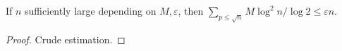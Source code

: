 \begin{sublemma}
\label{bound-score-3}
\leanok
If $n$ sufficiently large depending on $M, \varepsilon$, then
  $\sum_{p \leq \sqrt{n}} M \log^2 n / \log 2 \leq \varepsilon n$.
\end{sublemma}
\begin{proof}
\leanok
Crude estimation.
\end{proof}
